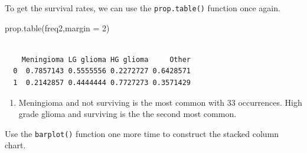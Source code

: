 \documentclass[
  letterpaper,
  DIV=11,
  numbers=noendperiod]{scrreprt}
\newenvironment{Shaded}{\begin{snugshade}}{\end{snugshade}}
\newcommand{\AttributeTok}[1]{\textcolor[rgb]{0.40,0.45,0.13}{#1}}
\newcommand{\DecValTok}[1]{\textcolor[rgb]{0.68,0.00,0.00}{#1}}
\newcommand{\FunctionTok}[1]{\textcolor[rgb]{0.28,0.35,0.67}{#1}}
\newcommand{\NormalTok}[1]{\textcolor[rgb]{0.00,0.23,0.31}{#1}}
\newcommand{\SpecialCharTok}[1]{\textcolor[rgb]{0.37,0.37,0.37}{#1}}
\newcommand{\StringTok}[1]{\textcolor[rgb]{0.13,0.47,0.30}{#1}}
\providecommand{\tightlist}{%
  \setlength{\itemsep}{0pt}\setlength{\parskip}{0pt}}\usepackage{longtable,booktabs,array}
\begin{document}
To get the survival rates, we can use the \texttt{prop.table()} function
once again.

\begin{Shaded}
\begin{Highlighting}[numbers=left,,]
\FunctionTok{prop.table}\NormalTok{(freq2,}\AttributeTok{margin =} \DecValTok{2}\NormalTok{)}
\end{Highlighting}
\end{Shaded}

\begin{verbatim}
   
    Meningioma LG glioma HG glioma     Other
  0  0.7857143 0.5555556 0.2272727 0.6428571
  1  0.2142857 0.4444444 0.7727273 0.3571429
\end{verbatim}

\begin{blackbox}

\begin{enumerate}
\def\labelenumi{\arabic{enumi}.}
\setcounter{enumi}{3}
\tightlist
\item
  Meningioma and not surviving is the most common with \(33\)
  occurrences. High grade glioma and surviving is the the second most
  common.
\end{enumerate}

\end{blackbox}

Use the \texttt{barplot()} function one more time to construct the
stacked column chart.

\begin{Shaded}
\end{Shaded}
\end{document}
